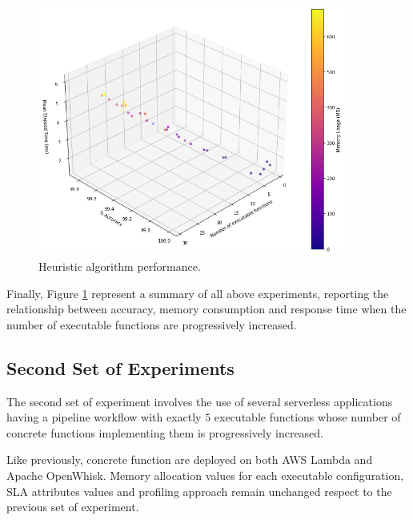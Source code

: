 \documentclass[12pt,a4paper]{report}
\begin{document}
\begin{figure}[h]
	\centering
	\includegraphics[width=0.9\textwidth]{./Images/ACO3DIncreasingExecutable.png}
	\caption{Heuristic algorithm performance.}%
	\label{ACO3DIncreasingExecutable}
\end{figure}

Finally, Figure \ref{ACO3DIncreasingExecutable} represent a summary of all above experiments, reporting the relationship between accuracy, memory consumption and response time when the number of executable functions are progressively increased.

\newpage
\subsection{Second Set of Experiments}

The second set of experiment involves the use of several serverless applications having a pipeline workflow with exactly $5$ executable functions whose number of concrete functions implementing them is progressively increased. 

Like previously, concrete function are deployed on both AWS Lambda and Apache OpenWhisk. Memory allocation values for each executable configuration, SLA attributes values and profiling approach  remain unchanged respect to the previous set of experiment. 
\end{document}
